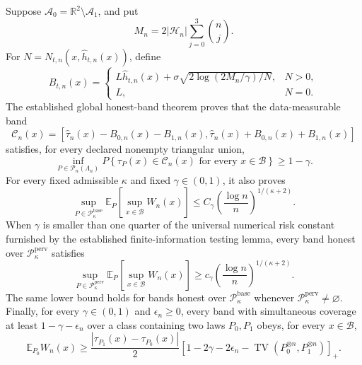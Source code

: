 Suppose \(\mathcal A_0=\mathbb R^2\setminus\mathcal A_1\), and put
\[
M_n=2|\mathcal H_n|\sum_{j=0}^3\binom nj.
\]
For \(N=N_{t,n}(x,\widehat h_{t,n}(x))\), define
\[
B_{t,n}(x)=
\begin{cases}
L\widehat h_{t,n}(x)+\sigma\sqrt{2\log(2M_n/\gamma)/N},&N>0,\\
L,&N=0.
\end{cases}
\]
The established global honest-band theorem proves that the data-measurable band
\[
\mathcal C_n(x)=
\left[\widehat\tau_n(x)-B_{0,n}(x)-B_{1,n}(x),
\widehat\tau_n(x)+B_{0,n}(x)+B_{1,n}(x)\right]
\]
satisfies, for every declared nonempty triangular union,
\[
\inf_{P\in\mathcal P_n(\Lambda_n)}
P\!\left\{\tau_P(x)\in\mathcal C_n(x)
\text{ for every }x\in\mathcal B\right\}\ge 1-\gamma.
\]
For every fixed admissible \(\kappa\) and fixed \(\gamma\in(0,1)\), it also proves
\[
\sup_{P\in\mathcal P_{\kappa}^{\mathrm{base}}}
\mathbb E_P\!\left[\sup_{x\in\mathcal B}W_n(x)\right]
\le C_\gamma\left(\frac{\log n}{n}\right)^{1/(\kappa+2)}.
\]
When \(\gamma\) is smaller than one quarter of the universal numerical risk constant furnished by the established finite-information testing lemma, every band honest over \(\mathcal P_{\kappa}^{\mathrm{perv}}\) satisfies
\[
\sup_{P\in\mathcal P_{\kappa}^{\mathrm{perv}}}
\mathbb E_P\!\left[\sup_{x\in\mathcal B}W_n(x)\right]
\ge c_\gamma\left(\frac{\log n}{n}\right)^{1/(\kappa+2)}.
\]
The same lower bound holds for bands honest over \(\mathcal P_{\kappa}^{\mathrm{base}}\) whenever \(\mathcal P_{\kappa}^{\mathrm{perv}}\ne\varnothing\). Finally, for every \(\gamma\in(0,1)\) and \(\epsilon_n\ge0\), every band with simultaneous coverage at least \(1-\gamma-\epsilon_n\) over a class containing two laws \(P_0,P_1\) obeys, for every \(x\in\mathcal B\),
\[
\mathbb E_{P_0}W_n(x)\ge
\frac{|\tau_{P_1}(x)-\tau_{P_0}(x)|}{2}
\left[1-2\gamma-2\epsilon_n-
\operatorname{TV}(P_0^{\otimes n},P_1^{\otimes n})\right]_+.
\]
